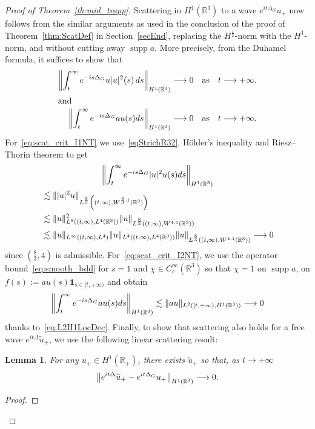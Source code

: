 \documentclass[10pt]{amsart}
\newtheorem{lemm}[theo]{Lemma}\newtheorem{prop}[theo]{Proposition}\newtheorem{coro}[theo]{Corollary}\newtheorem{conj}[theo]{Conjecture}
\theoremstyle{definition}\newtheorem{defi}[theo]{Definition}\newtheorem{rema}[theo]{Remark}\newtheorem{exam}[theo]{Example}\newtheorem{exem}[theo]{Example}\newtheorem{nota}[theo]{Notation}
\newcommand*\R{\mathbb{R}}
\DeclareMathOperator{\supp}{supp}
\renewcommand*{\to}{\mathchoice{\longrightarrow}{\rightarrow}{\rightarrow}{\rightarrow}}
\begin{document}
\begin{proof}[Proof of Theorem~\ref{th:mid_trapp}]
Scattering in $H^1(\R^3)$ to a wave $e^{it\Delta_G}u_+$ now follows from the similar arguments as used in the conclusion of the proof of Theorem~\ref{thm:ScatDef} in Section~\ref{secEnd}, replacing the $H^{\frac 12} $-norm with the $H^1 $-norm, and without cutting away $\supp a$. More precisely, from the Duhamel formula, it suffices to show that
\begin{align}
\left\| \int_t^\infty e^{-is\Delta_G}u|u|^{2}(s) \, ds \right\|_{H^{1}(\R^3)} &\to 0 \quad\text{as}\quad t\to +\infty,
\label{eq:scat_crit_I1NT}
\\
\intertext{and}
\left\| \int_t^\infty e^{-is\Delta_G} a u(s) ds \right\|_{H^{1}(\R^3)} &\to 0 \quad\text{as}\quad t\to +\infty.
\label{eq:scat_crit_I2NT}
\end{align}
For~\eqref{eq:scat_crit_I1NT} we use~\eqref{eqStrichR32}, H{\"o}lder's inequality and Riesz--Thorin theorem to get
\begin{multline*}
\left\| \int_t^\infty e^{-is\Delta_G} |u|^2 u(s) ds \right\|_{H^{1}(\R^3)}\\
\begin{aligned}
&\lesssim \| |u|^2 u \|_{L^\frac{8}{5}\left((t,\infty), W^{\frac{4}{3},1}(\R^3)\right)} \\
&\lesssim \| u \|_{L^8\left((t,\infty),L^4(\R^3)\right)}^2 \| u \|_{L^\frac{8}{3}\left((t,\infty), W^{4,1}(\R^3)\right)} \\
&\lesssim \| u \|_{L^\infty((t,\infty),L^4)} \| u \|_{L^4\left((t,\infty),L^4(\R^3)\right)} \| u \|_{L^\frac{8}{3}\left((t,\infty), W^{4,1}(\R^3)\right)} \to 0
\end{aligned}
\end{multline*}
since $(\frac{8}{3},4)$ is admissible. For~\eqref{eq:scat_crit_I2NT}, we use the operator bound~\eqref{eq:smooth_bdd} for $s=1$ and $\chi \in C^\infty_c(\R^3)$ so that $\chi = 1$ on $\supp a$, on $f(s) := au(s) \mathbf 1_{s \in [t, +\infty)}$ and obtain
\[
\left\| \int_t^\infty e^{-is\Delta_G} a u(s) ds \right\|_{H^{1}(\R^3)} \lesssim \| au \|_{L^2([t, + \infty), H^{1}(\R^3))} \to 0
\]
thanks to~\eqref{eq:L2H1LocDec}. Finally, to show that scattering also holds for a free wave $e^{it\Delta}\widetilde u_+$, we use the following linear scattering result:
\begin{lemm}
For any $u_+ \in H^1(\R_+)$, there exists $\widetilde u_+$ so that, as $t \to +\infty$
\[
\left\| e^{it\Delta}\widetilde u_+ - e^{it\Delta_G} u_+ \right\|_{H^1(\R^3)} \to 0.
\]
\end{lemm}
\begin{proof}

\end{proof}
\end{proof}
\end{document}
